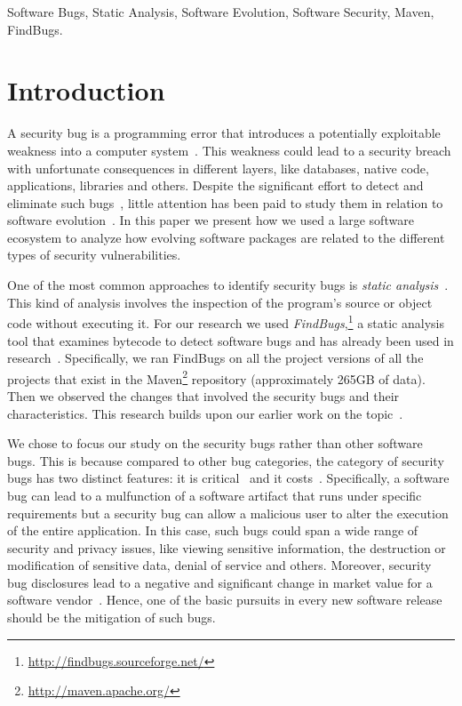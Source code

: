 \documentclass[conference]{IEEEtran}
\begin{document}
\begin{IEEEkeywords}
Software Bugs, Static Analysis, Software Evolution, Software
Security, Maven, FindBugs.
\end{IEEEkeywords}

\IEEEpeerreviewmaketitle

\section{Introduction}

A security bug is a programming error that introduces a potentially
exploitable weakness into a computer system~\cite{SSL12, TJBD11}. This weakness could lead to a
security breach with unfortunate consequences in different layers, like databases,
native code, applications, libraries and others. Despite the significant
effort to detect and eliminate such bugs~\cite{SZ12}, little attention has been paid to
study them in relation to software evolution~\cite{L96, LRWPT97, IB06, RGMA06}.
In this paper we present how we used a large software ecosystem to analyze
how evolving software packages are related to the different types of security
vulnerabilities.

One of the most common approaches to identify security bugs is
{\it static analysis}~\cite{CW07}. This kind of analysis involves the
inspection of the program's source or object code without executing
it. For our research we used {\it FindBugs},\footnote{\url{http://findbugs.sourceforge.net/}}
a static analysis tool that examines bytecode to detect software bugs and has already been used in
research~\cite{AP10, HP07, HP04}. Specifically, we ran FindBugs on all the project
versions of all the projects that exist in the Maven\footnote{\url{http://maven.apache.org/}}
repository (approximately 265GB of data). Then we observed the changes that
involved the security bugs and their characteristics. This research builds upon
our earlier work on the topic~\cite{MGS12}.

We chose to focus our study on the security bugs rather than other
software bugs. This is because compared to other bug categories,
the category of security bugs has two distinct features: it is critical~\cite{SZ12}
and it costs~\cite{BCL08}. Specifically, a software bug can
lead to a mulfunction of a software artifact that runs under specific
requirements but a security bug can allow a malicious user to alter the execution
of the entire application. In this case, such bugs could span a wide
range of security and privacy issues, like viewing sensitive information, the destruction or
modification of sensitive data, denial of service and others.
Moreover, security bug disclosures lead to a negative and significant change
in market value for a software vendor~\cite{TW07}.
Hence, one of the basic pursuits in every new software release should
be the mitigation of such bugs.
\end{document}
